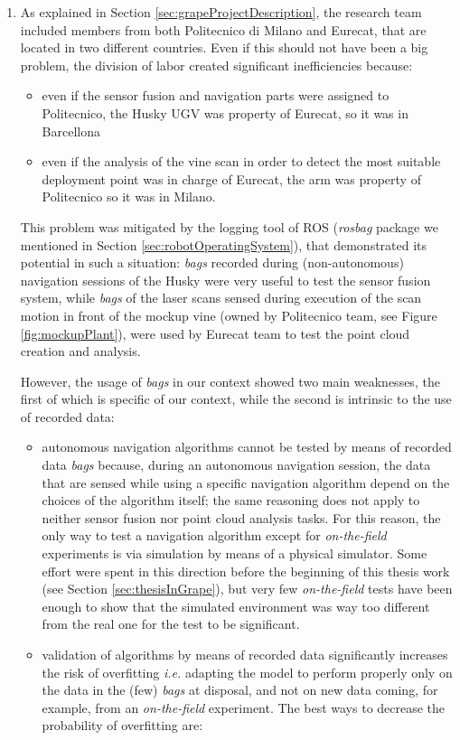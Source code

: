 \begin{enumerate}
	\item As explained in Section \ref{sec:grapeProjectDescription}, the research team included members from both Politecnico di Milano and Eurecat, that are located in two different countries. Even if this should not have been a big problem, the division of labor created significant inefficiencies because:
	\begin{itemize}
		\item even if the sensor fusion and navigation parts were assigned to Politecnico, the Husky \ac{UGV} was property of Eurecat, so it was in Barcellona
		\item even if the analysis of the vine scan in order to detect the most suitable deployment point was in charge of Eurecat, the arm was property of Politecnico so it was in Milano.
	\end{itemize}
	This problem was mitigated by the logging tool of \ac{ROS} (\textit{rosbag} package we mentioned in Section \ref{sec:robotOperatingSystem}), that demonstrated its potential in such a situation: \textit{bags} recorded during (non-autonomous) navigation sessions of the Husky were very useful to test the sensor fusion system, while \textit{bags} of the laser scans sensed during execution of the scan motion in front of the mockup vine (owned by Politecnico team, see Figure \ref{fig:mockupPlant}), were used by Eurecat team to test the point cloud creation and analysis. 
\par However, the usage of \textit{bags} in our context showed two main weaknesses, the first of which is specific of our context, while the second is intrinsic to the use of recorded data:
\begin{itemize}
	\item autonomous navigation algorithms cannot be tested by means of recorded data \textit{bags} because, during an autonomous navigation session, the data that are sensed while using a specific navigation algorithm depend on the choices of the algorithm itself; the same reasoning does not apply to neither sensor fusion nor point cloud analysis tasks.
	For this reason, the only way to test a navigation algorithm except for \textit{on-the-field} experiments is via simulation by means of a physical simulator. Some effort were spent in this direction before the beginning of this thesis work (see Section \ref{sec:thesisInGrape}), but very few \textit{on-the-field} tests have been enough to show that the simulated environment was way too different from the real one for the test to be significant.
	\item validation of algorithms by means of recorded data significantly increases the risk of overfitting \textit{i.e.} adapting the model to perform properly only on the data in the (few) \textit{bags} at disposal, and not on new data coming, for example, from an \textit{on-the-field} experiment. The best ways to decrease the probability of overfitting are:

\end{itemize}
\end{enumerate}
